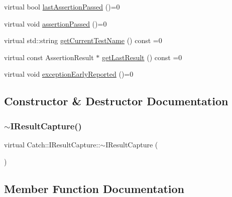 \begin{DoxyCompactItemize}
\item 
virtual bool \mbox{\hyperlink{struct_catch_1_1_i_result_capture_a973435fbdcb2f6f07a0ec5719a01e956}{last\+Assertion\+Passed}} ()=0
\item 
virtual void \mbox{\hyperlink{struct_catch_1_1_i_result_capture_a9b0ef2cb071e9a9dc6ec1b533026aea7}{assertion\+Passed}} ()=0
\item 
virtual std\+::string \mbox{\hyperlink{struct_catch_1_1_i_result_capture_aea1617f4a84cc648246aa3ed6918b5bf}{get\+Current\+Test\+Name}} () const =0
\item 
virtual const Assertion\+Result $\ast$ \mbox{\hyperlink{struct_catch_1_1_i_result_capture_ab18872c89fab97405a56e9c6a4919736}{get\+Last\+Result}} () const =0
\item 
virtual void \mbox{\hyperlink{struct_catch_1_1_i_result_capture_ae63ecec95db4c236c63ecf616f483810}{exception\+Early\+Reported}} ()=0
\end{DoxyCompactItemize}


\subsection{Constructor \& Destructor Documentation}
\mbox{\label{struct_catch_1_1_i_result_capture_a3bd16719d6772b7470887fc36c6d0808}} 
\subsubsection{\texorpdfstring{$\sim$\+I\+Result\+Capture()}{~IResultCapture()}}
{\footnotesize\ttfamily virtual Catch\+::\+I\+Result\+Capture\+::$\sim$\+I\+Result\+Capture (\begin{DoxyParamCaption}{ }\end{DoxyParamCaption})\hspace{0.3cm}{\ttfamily [virtual]}}



\subsection{Member Function Documentation}
\mbox{\label{struct_catch_1_1_i_result_capture_ab020d111e29ad1cabe1227dcfda712ef}} 
